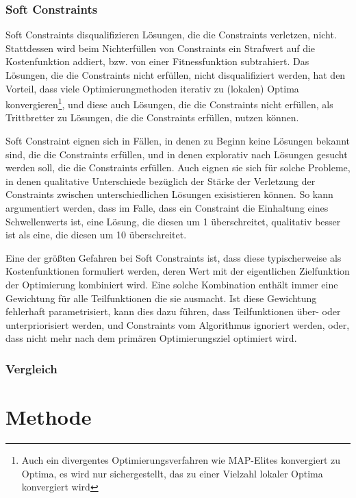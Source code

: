 \subsubsection{Soft Constraints}
Soft Constraints disqualifizieren Lösungen, die die Constraints verletzen, nicht.
Stattdessen wird beim Nichterfüllen von Constraints ein Strafwert auf die Kostenfunktion addiert, bzw. von einer Fitnessfunktion subtrahiert.
Das Lösungen, die die Constraints nicht erfüllen, nicht disqualifiziert werden, hat den Vorteil, dass viele Optimierungmethoden iterativ zu (lokalen) Optima konvergieren\footnote{Auch ein divergentes Optimierungsverfahren wie MAP-Elites konvergiert zu Optima, es wird nur sichergestellt, das zu einer Vielzahl lokaler Optima konvergiert wird}, 
und diese auch Lösungen, die die Constraints nicht erfüllen, als Trittbretter zu Lösungen, die die Constraints erfüllen, nutzen können.

Soft Constraint eignen sich in Fällen, in denen zu Beginn keine Lösungen bekannt sind, die die Constraints erfüllen, und in denen explorativ nach Lösungen gesucht werden soll, die die Constraints erfüllen.
Auch eignen sie sich für solche Probleme, in denen qualitative Unterschiede bezüglich der Stärke der Verletzung der Constraints zwischen unterschiedlichen Lösungen exisistieren können.
So kann argumentiert werden, dass im Falle, dass ein Constraint die Einhaltung eines Schwellenwerts ist, eine Lösung, die diesen um 1 überschreitet, qualitativ besser ist als eine, die diesen um 10 überschreitet.

Eine der größten Gefahren bei Soft Constraints ist, dass diese typischerweise als Kostenfunktionen formuliert werden, deren Wert mit der eigentlichen Zielfunktion der Optimierung kombiniert wird.
Eine solche Kombination enthält immer eine Gewichtung für alle Teilfunktionen die sie ausmacht.
Ist diese Gewichtung fehlerhaft parametrisiert, kann dies dazu führen, dass Teilfunktionen über- oder unterpriorisiert werden, und Constraints vom Algorithmus ignoriert werden, oder, dass nicht mehr nach dem primären Optimierungsziel optimiert wird.

\subsubsection{Vergleich}



\newpage

\section{Methode}

